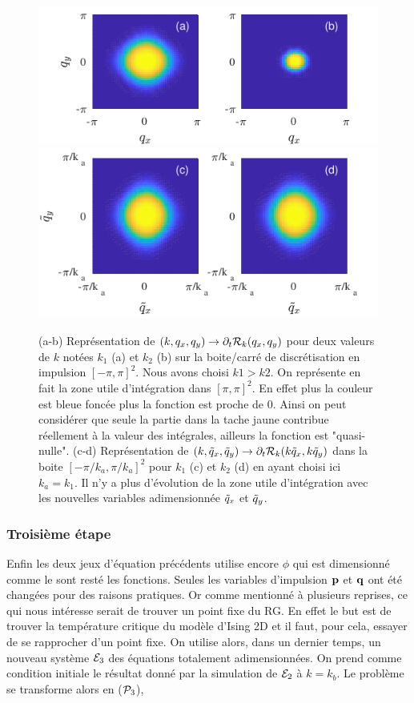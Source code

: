 \documentclass[10pt]{article}
\begin{document}
\begin{multicols}{2}
\begin{figure}[H]
\begin{center}
	\includegraphics[width=0.95\columnwidth]{DerRegIsing.pdf}
	\includegraphics[width=0.95\columnwidth, height = 0.4\columnwidth]{DerRegIsing2.pdf}
\end{center}
\caption{(a-b) Représentation  de $(k, q_x, q_y) \to \partial_t \mathcal{R}_k(q_x, q_y)$ pour deux valeurs de  $k$ notées $k_1$ (a) et $k_2$ (b) sur la boite/carré de discrétisation en impulsion $[-\pi, \pi]^2$. Nous avons choisi $k1>k2$. On représente en fait la zone utile d'intégration dans $[\pi, \pi]^2$. En effet plus la couleur est bleue foncée plus la fonction est proche de 0. Ainsi on peut considérer que seule la partie dans la tache jaune contribue réellement à la valeur des intégrales, ailleurs la fonction est "quasi-nulle". (c-d) Représentation de $(k, \tilde{q}_x, \tilde{q}_y) \to \partial_t \mathcal{R}_k(k\tilde{q}_x, k\tilde{q}_y)$ dans la boite $[-\pi/k_a, \pi/k_a]^2$ pour  $k_1$ (c) et $k_2$ (d) en ayant choisi ici $k_a = k_1$. Il n'y a plus d'évolution de la zone utile d'intégration avec les nouvelles variables adimensionnée $\tilde{q}_x$ et $\tilde{q}_y$.}
\label{fig:DerRegIsing}
\end{figure}


\subsubsection{Troisième étape}

Enfin les deux jeux d'équation précédents utilise encore $\phi$ qui est dimensionné comme le sont resté les fonctions. Seules les variables d'impulsion ${\bf p}$ et ${\bf q}$ ont été changées pour des raisons pratiques. Or comme mentionné à plusieurs reprises, ce qui nous intéresse serait de trouver un point fixe du RG. En effet le but est de trouver la température critique du modèle d'Ising 2D et il faut, pour cela, essayer de se rapprocher d'un point fixe. On utilise alors, dans un dernier temps, un nouveau système $\mathcal{E}_3$ des équations totalement adimensionnées. On prend comme condition initiale le résultat donné par la simulation de $\mathcal{E}_2$ à $k = k_b$. Le problème se transforme alors en ($\mathcal{P}_3$), \\


\end{multicols}
\end{document}
